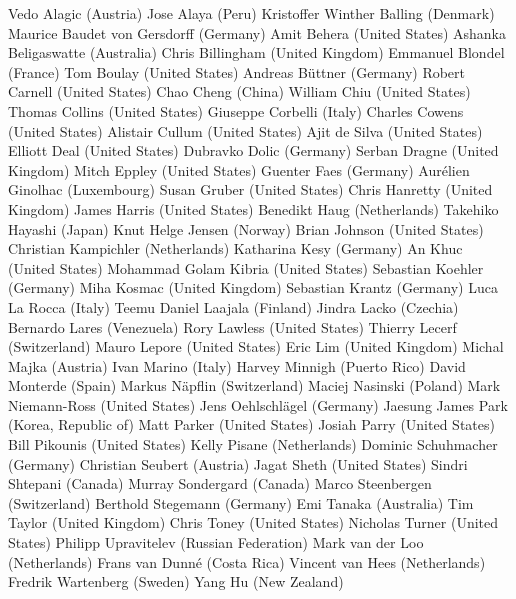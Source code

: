 Vedo Alagic (Austria)
Jose Alaya (Peru)
Kristoffer Winther Balling (Denmark)
Maurice Baudet von Gersdorff (Germany)
Amit Behera (United States)
Ashanka Beligaswatte (Australia)
Chris Billingham (United Kingdom)
Emmanuel Blondel (France)
Tom Boulay (United States)
Andreas Büttner (Germany)
Robert Carnell (United States)
Chao Cheng (China)
William Chiu (United States)
Thomas Collins (United States)
Giuseppe Corbelli (Italy)
Charles Cowens (United States)
Alistair Cullum (United States)
Ajit de Silva (United States)
Elliott Deal (United States)
Dubravko Dolic (Germany)
Serban Dragne (United Kingdom)
Mitch Eppley (United States)
Guenter Faes (Germany)
Aurélien Ginolhac (Luxembourg)
Susan Gruber (United States)
Chris Hanretty (United Kingdom)
James Harris (United States)
Benedikt Haug (Netherlands)
Takehiko Hayashi (Japan)
Knut Helge Jensen (Norway)
Brian Johnson (United States)
Christian Kampichler (Netherlands)
Katharina Kesy (Germany)
An Khuc (United States)
Mohammad Golam Kibria (United States)
Sebastian Koehler (Germany)
Miha Kosmac (United Kingdom)
Sebastian Krantz (Germany)
Luca La Rocca (Italy)
Teemu Daniel Laajala (Finland)
Jindra Lacko (Czechia)
Bernardo Lares (Venezuela)
Rory Lawless (United States)
Thierry Lecerf (Switzerland)
Mauro Lepore (United States)
Eric Lim (United Kingdom)
Michal Majka (Austria)
Ivan Marino (Italy)
Harvey Minnigh (Puerto Rico)
David Monterde (Spain)
Markus Näpflin (Switzerland)
Maciej Nasinski (Poland)
Mark Niemann-Ross (United States)
Jens Oehlschlägel (Germany)
Jaesung James Park (Korea, Republic of)
Matt Parker (United States)
Josiah Parry (United States)
Bill Pikounis (United States)
Kelly Pisane (Netherlands)
Dominic Schuhmacher (Germany)
Christian Seubert (Austria)
Jagat Sheth (United States)
Sindri Shtepani (Canada)
Murray Sondergard (Canada)
Marco Steenbergen (Switzerland)
Berthold Stegemann (Germany)
Emi Tanaka (Australia)
Tim Taylor (United Kingdom)
Chris Toney (United States)
Nicholas Turner (United States)
Philipp Upravitelev (Russian Federation)
Mark van der Loo (Netherlands)
Frans van Dunné (Costa Rica)
Vincent van Hees (Netherlands)
Fredrik Wartenberg (Sweden)
Yang Hu (New Zealand)


\address{%
Torsten Hothorn\\
Universität Zürich\\%
Switzerland\\
%
%
\textit{ORCiD: \href{https://orcid.org/0000-0001-8301-0471}{0000-0001-8301-0471}}\\%
\href{mailto:Torsten.Hothorn@R-project.org}{\nolinkurl{Torsten.Hothorn@R-project.org}}%
}
